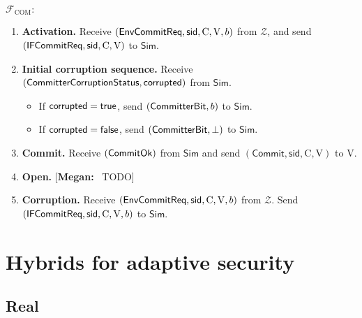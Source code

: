 \documentclass[11pt,letterpaper]{article}
\newcommand{\doclearpage}{%
  \iffull\clearpage\else\fi
}
\newcommand{\authnote}[2]{[{\color{red}\textbf{#1:}}~{\color{blue} #2}]}
\newcommand{\authnote}[2]{}
\newcommand{\megan}[1]{\authnote{Megan}{#1}}
\theoremstyle{plain} %
\theoremstyle{definition} %
\theoremstyle{remark} %
\newcommand{\CommitMsg}{\mathsf{Commit}}
\newcommand{\Simulator}{{\mathsf{Sim}}} %
\newcommand{\Environment}{{\mathcal{Z}}} %
\newcommand{\IF}{\mathcal{F}} %
\newcommand{\sid}{\mathsf{sid}}
\newcommand{\True}{\mathsf{true}}
\newcommand{\False}{\mathsf{false}}
\newcommand{\IFCom}{\IF_{\mathrm{COM}}}
\newcommand{\PartyCommitter}{\mathrm{C}}
\newcommand{\PartyVerifier}{\mathrm{V}}
\newcommand{\CommBit}{b}
\begin{document}
$\IFCom:$
\begin{enumerate}
	\item \textbf{Activation.} Receive $(\EnvCommitReqMsg, \sid, \PartyCommitter, \PartyVerifier, \CommBit)$ from $\Environment$, and send $(\IFCommitReqMsg, \sid, \PartyCommitter,\PartyVerifier)$ to $\Simulator$.

	\item \textbf{Initial corruption sequence.} Receive $(\mathsf{CommitterCorruptionStatus}, \mathsf{corrupted})$ from $\Simulator$.
	\begin{itemize}
		\item If $\CommitterCorruptedBit = \True$, send $(\CommitterBitMsg, \CommBit)$ to $\Simulator$.
		\item If $\CommitterCorruptedBit = \False$, send $(\mathsf{CommitterBit}, \bot)$ to $\Simulator$.
	\end{itemize}

	\item \textbf{Commit.} Receive $(\mathsf{CommitOk})$ from $\Simulator$ and send $(\CommitMsg, \sid, \PartyCommitter, \PartyVerifier)$ to $\PartyVerifier$.

	\item \textbf{Open.} \megan{TODO}

	\item \textbf{Corruption.} Receive $(\EnvCommitReqMsg, \sid, \PartyCommitter, \PartyVerifier, \CommBit)$ from $\Environment$. Send $(\IFCommitReqMsg, \sid, \PartyCommitter,\PartyVerifier, \CommBit)$ to $\Simulator$.
\end{enumerate}


\doclearpage
\section{Hybrids for adaptive security}
\label{sec:hybrids-adaptive}

\newcommand{\CommitterId}{\mathsf{cid}}
\newcommand{\ReceiverId}{\mathsf{rid}}
\subsection{Real}
\label{sec:real-distr}
\end{document}
